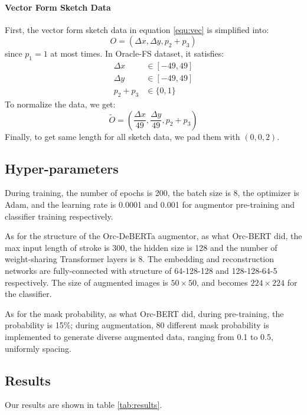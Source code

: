 \documentclass{article}
\begin{document}
\paragraph{Vector Form Sketch Data}
First, the vector form sketch data in equation \ref{equ:vec} is simplified into:
\begin{equation*}
	O = (\Delta x, \Delta y, p_2 + p_3) 
\end{equation*} 
since $ p_1 = 1 $ at most times.
In Oracle-FS dataset, it satisfies:
\begin{align*}
	\Delta x &\in [-49, 49] \\
	\Delta y &\in [-49, 49] \\
	p_2 + p_3 &\in \{0, 1\}
\end{align*}
To normalize the data, we get:
\begin{equation*}
	\tilde{O} = 
	(\frac{\Delta x}{49}, \frac{\Delta y}{49},	p_2 + p_3) 
\end{equation*} 
Finally, to get same length for all sketch data, we pad them with $(0, 0, 2)$.

\subsection{Hyper-parameters}

During training, the number of epochs is 200, the batch size is 8, the optimizer is Adam, and the learning rate is 0.0001 and 0.001 for augmentor pre-training and classifier training respectively.

As for the structure of the Orc-DeBERTa augmentor, as what Orc-BERT did, the max input length of stroke is 300, the hidden size is 128 and the number of weight-sharing Transformer layers is 8. The embedding and reconstruction networks are fully-connected with structure of 64-128-128 and 128-128-64-5 respectively. The size of augmented images is $ 50 \times 50 $, and becomes $ 224 \times 224 $ for the classifier.

As for the mask probability, as what Orc-BERT did, during pre-training, the probability is 15\%; during augmentation, 80 different mask probability is implemented to generate diverse augmented data, ranging from 0.1 to 0.5, uniformly spacing.

\subsection{Results}

Our results are shown in table \ref{tab:results}.
\end{document}
